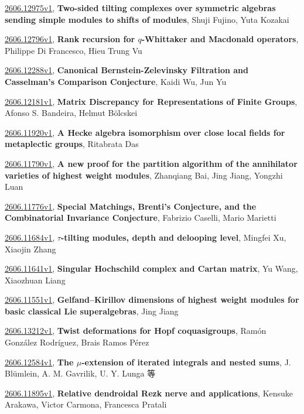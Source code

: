 \documentclass[9pt, a4paper]{article}
\theoremstyle{plain}
\theoremstyle{definition}
\theoremstyle{remark}
\newcommand{\arxiv}[3]{\href{https://arxiv.org/abs/#1}{#1}, \textbf{\textcolor{arxivblue}{#2}}, #3}
\begin{document}
\arxiv{2606.12975v1}{Two-sided tilting complexes over symmetric algebras sending simple modules to shifts of modules}{Shuji Fujino, Yuta Kozakai}

\arxiv{2606.12796v1}{Rank recursion for $q$-Whittaker and Macdonald operators}{Philippe Di Francesco, Hieu Trung Vu}

\arxiv{2606.12288v1}{Canonical Bernstein-Zelevinsky Filtration and Casselman's Comparison Conjecture}{Kaidi Wu, Jun Yu}

\arxiv{2606.12181v1}{Matrix Discrepancy for Representations of Finite Groups}{Afonso S. Bandeira, Helmut Bölcskei}

\arxiv{2606.11920v1}{A Hecke algebra isomorphism over close local fields for metaplectic groups}{Ritabrata Das}

\arxiv{2606.11790v1}{A new proof for the partition algorithm of the annihilator varieties of highest weight modules}{Zhanqiang Bai, Jing Jiang, Yongzhi Luan}

\arxiv{2606.11776v1}{Special Matchings, Brenti's Conjecture, and the Combinatorial Invariance Conjecture}{Fabrizio Caselli, Mario Marietti}

\arxiv{2606.11684v1}{$τ$-tilting modules, depth and delooping level}{Mingfei Xu, Xiaojin Zhang}

\arxiv{2606.11641v1}{Singular Hochschild complex and Cartan matrix}{Yu Wang, Xiaozhuan Liang}

\arxiv{2606.11551v1}{Gelfand--Kirillov dimensions of highest weight modules for basic classical Lie superalgebras}{Jing Jiang}

\arxiv{2606.13212v1}{Twist deformations for Hopf coquasigroups}{Ramón González Rodríguez, Brais Ramos Pérez}

\arxiv{2606.12584v1}{The $μ$-extension of iterated integrals and nested sums}{J. Blümlein, A. M. Gavrilik, U. Y. Lunga 等}

\arxiv{2606.11895v1}{Relative dendroidal Rezk nerve and applications}{Kensuke Arakawa, Victor Carmona, Francesca Pratali}

\end{document}
